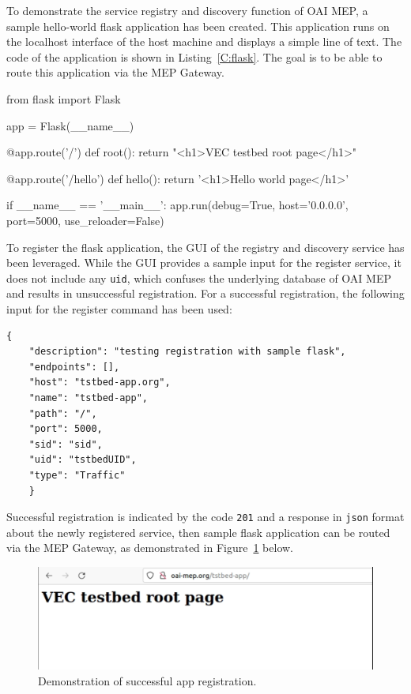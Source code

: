 \documentclass[12pt,a4paper,twoside]{report}
\begin{document}
To demonstrate the service registry and discovery function of OAI MEP, a sample hello-world flask application has been created. This application runs on the localhost interface of the host machine and displays a simple line of text. The code of the application is shown in Listing~\ref{C:flask}. The goal is to be able to route this application via the MEP Gateway.
%
\begin{flask}[caption={Sample flask app in python}, label={C:flask}]
	from flask import Flask

	app = Flask(__name__)

	@app.route('/')
	def root():
		return "<h1>VEC testbed root page</h1>"

	@app.route('/hello')
	def hello():
		return '<h1>Hello world page</h1>'

	if __name__ == '__main__':
		app.run(debug=True, host='0.0.0.0', port=5000, use_reloader=False)
\end{flask}

To register the flask application, the GUI of the registry and discovery service has been leveraged. While the GUI provides a sample input for the register service, it does not include any \verb|uid|, which confuses the underlying database of OAI MEP and results in unsuccessful registration. For a successful registration, the following input for the register command has been used:
%
\pagebreak
\begin{verbatim}
{
	"description": "testing registration with sample flask",
	"endpoints": [],
	"host": "tstbed-app.org",
	"name": "tstbed-app",
	"path": "/",
	"port": 5000,
	"sid": "sid",
	"uid": "tstbedUID",
	"type": "Traffic"
	}
\end{verbatim}
Successful registration is indicated by the code \verb|201| and a response in \verb|json| format about the newly registered service, then sample flask application can be routed via the MEP Gateway, as demonstrated in Figure~\ref{F:flask-hello-demo} below.
%
\begin{figure}[!ht]
	\centering
	\includegraphics[width=13cm]{./images/flask-demo.png} 
	\caption{Demonstration of successful app registration.}
	\label{F:flask-hello-demo}
\end{figure}
\end{document}
